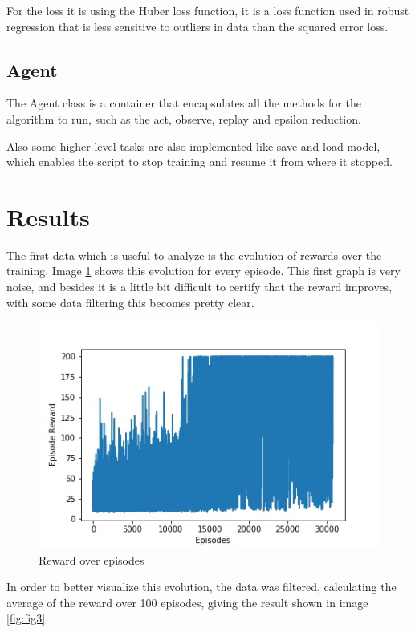 \documentclass{article}
\begin{document}
For the loss it is using the Huber loss function, it is a loss function used in robust regression that is less sensitive to outliers in data than the squared error loss.

\subsection{Agent}
The Agent class is a container that encapsulates all the methods for the algorithm to run, such as the act, observe, replay and epsilon reduction.

Also some higher level tasks are also implemented like save and load model, which enables the script to stop training and resume it from where it stopped.

\section{Results}
The first data which is useful to analyze is the evolution of rewards over the training. Image \ref{fig:fig2} shows this evolution for every episode. This first graph is very noise, and besides it is a little bit difficult to certify that the reward improves, with some data filtering this becomes pretty clear.

\begin{figure}[!ht]
\centering
\includegraphics[scale=0.6]{rewardOverEpisodes}
\caption{Reward over episodes}
\label{fig:fig2}
\end{figure}

In order to better visualize this evolution, the data was filtered, calculating the average of the reward over 100 episodes, giving the result shown in image \ref{fig:fig3}.
\end{document}
